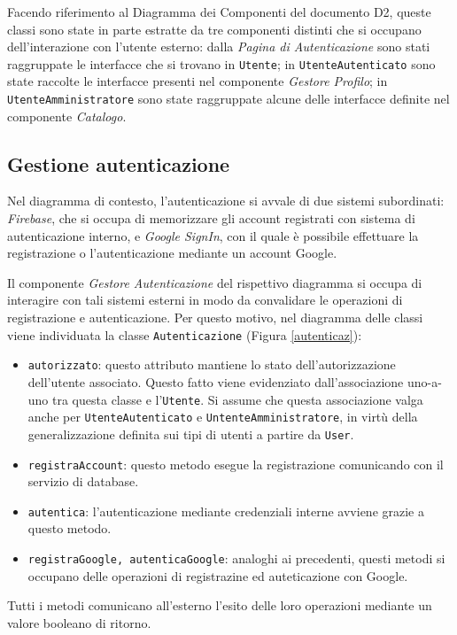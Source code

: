 \documentclass[11pt, a4paper]{article}
\theoremstyle{definition} %
\begin{document}
Facendo riferimento al Diagramma dei Componenti del
documento D2, queste classi sono state in parte estratte da tre componenti
distinti che si occupano dell'interazione con l'utente esterno: dalla
\textit{Pagina di Autenticazione} sono stati raggruppate le interfacce che
si trovano in \texttt{Utente}; in \texttt{UtenteAutenticato} sono state
raccolte le interfacce presenti nel componente \textit{Gestore Profilo};
in \texttt{UtenteAmministratore} sono state raggruppate alcune delle interfacce
definite nel componente \textit{Catalogo}.


\newpage
\subsection{Gestione autenticazione}
Nel diagramma di contesto, l'autenticazione si avvale di due sistemi
subordinati: \textit{Firebase}, che si occupa di memorizzare gli account
registrati con sistema di autenticazione interno, e \textit{Google SignIn},
con il quale è possibile effettuare la registrazione o l'autenticazione
mediante un account Google.

Il componente \textit{Gestore Autenticazione} del rispettivo diagramma si
occupa di interagire con tali sistemi esterni in modo da convalidare le
operazioni di registrazione e autenticazione. Per questo motivo, nel diagramma
delle classi viene individuata la classe \texttt{Autenticazione} (Figura \ref{autenticaz}):
\begin{itemize}
    \item \texttt{autorizzato}: questo attributo mantiene lo stato dell'autorizzazione
    dell'utente associato. Questo fatto viene evidenziato dall'associazione
    uno-a-uno tra questa classe e l'\texttt{Utente}. Si assume che questa
    associazione valga anche per \texttt{UtenteAutenticato} e \texttt{UntenteAmministratore},
    in virtù della generalizzazione definita sui tipi di utenti a partire da \texttt{User}.
    \item \texttt{registraAccount}: questo metodo esegue la registrazione
    comunicando con il servizio di database.
    \item \texttt{autentica}: l'autenticazione mediante credenziali interne
    avviene grazie a questo metodo.
    \item \texttt{registraGoogle, autenticaGoogle}: analoghi ai precedenti,
    questi metodi si occupano delle operazioni di registrazine ed auteticazione
    con Google.
\end{itemize}
Tutti i metodi comunicano all'esterno l'esito delle loro operazioni mediante
un valore booleano di ritorno.
\end{document}
